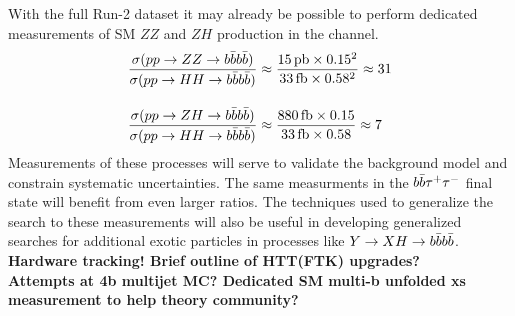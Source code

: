 With the full Run-2 dataset it may already be possible to perform dedicated measurements of SM $ZZ$ and $ZH$ production in the \bbbb channel.
\begin{equation*}
  \begin{split}
    \frac{\sigma(pp\rightarrow ZZ\rightarrow b\bar{b}b\bar{b})  }{\sigma(pp\rightarrow HH\rightarrow b\bar{b}b\bar{b})  } &\approx \frac{15\,\rm{pb}\times0.15^2}{33\,\rm{fb}\times0.58^2} \approx 31 \\[10pt]
    \frac{\sigma(pp\rightarrow ZH\rightarrow b\bar{b}b\bar{b})  }{\sigma(pp\rightarrow HH\rightarrow b\bar{b}b\bar{b})  } &\approx \frac{880\,\rm{fb}\times0.15}{33\,\rm{fb}\times0.58} \approx 7
  \end{split}
\end{equation*}
Measurements of these processes will serve to validate the background model and constrain systematic uncertainties.
The same measurments in the $b\bar{b}\tau^+\tau^-$ final state will benefit from even larger ratios. 
The techniques used to generalize the \hh search to these measurements will also be useful in developing generalized \bbbb searches for additional exotic particles in processes like $Y\rightarrow XH\rightarrow b\bar{b}b\bar{b}$.
\\[20pt]
\bf{Hardware tracking! Brief outline of HTT(FTK) upgrades?}
\\[20pt]
\bf{Attempts at 4b multijet MC? Dedicated SM multi-b unfolded xs measurement to help theory community?}




